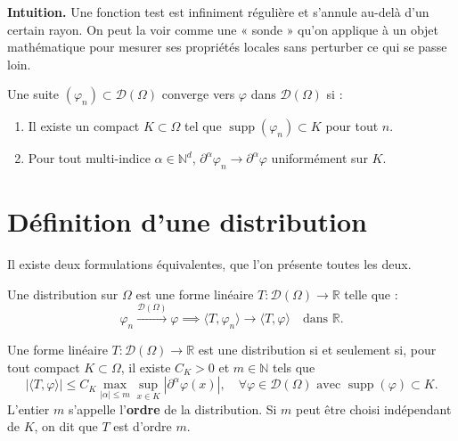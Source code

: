 \documentclass[12pt,a4paper,openany]{book}
\theoremstyle{definition}
\theoremstyle{plain}
\theoremstyle{remark}
\begin{document}
	\textbf{Intuition.} Une fonction test est infiniment régulière et s'annule au-delà d'un certain rayon. On peut la voir comme une « sonde » qu'on applique à un objet mathématique pour mesurer ses propriétés locales sans perturber ce qui se passe loin.
	
	\begin{definition}
		Une suite $(\varphi_n) \subset \mathcal{D}(\Omega)$ converge vers $\varphi$ dans $\mathcal{D}(\Omega)$ si :
		\begin{enumerate}
			\item[(i)] Il existe un compact $K \subset \Omega$ tel que $\operatorname{supp}(\varphi_n) \subset K$ pour tout $n$.
			\item[(ii)] Pour tout multi-indice $\alpha \in \mathbb{N}^d$, $\partial^\alpha \varphi_n \to \partial^\alpha \varphi$ uniformément sur $K$.
		\end{enumerate}
	\end{definition}
	
	\section{Définition d'une distribution}
	
	Il existe deux formulations équivalentes, que l'on présente toutes les deux.
	
	\begin{definition}
		Une distribution sur $\Omega$ est une forme linéaire $T : \mathcal{D}(\Omega) \to \mathbb{R}$ telle que :
		\[
		\varphi_n \xrightarrow{\mathcal{D}(\Omega)} \varphi \implies \langle T, \varphi_n \rangle \to \langle T, \varphi \rangle \quad \text{dans } \mathbb{R}.
		\]
	\end{definition}
	
	\begin{definition}
		Une forme linéaire $T : \mathcal{D}(\Omega) \to \mathbb{R}$ est une distribution si et seulement si, pour tout compact $K \subset \Omega$, il existe $C_K > 0$ et $m \in \mathbb{N}$ tels que
		\[
		|\langle T, \varphi \rangle| \le C_K \max_{|\alpha| \le m} \sup_{x \in K} |\partial^\alpha \varphi(x)|, \quad \forall \varphi \in \mathcal{D}(\Omega) \text{ avec } \operatorname{supp}(\varphi) \subset K.
		\]
		L'entier $m$ s'appelle l'\textbf{ordre} de la distribution. Si $m$ peut être choisi indépendant de $K$, on dit que $T$ est d'ordre $m$.
	\end{definition}
	
\end{document}
